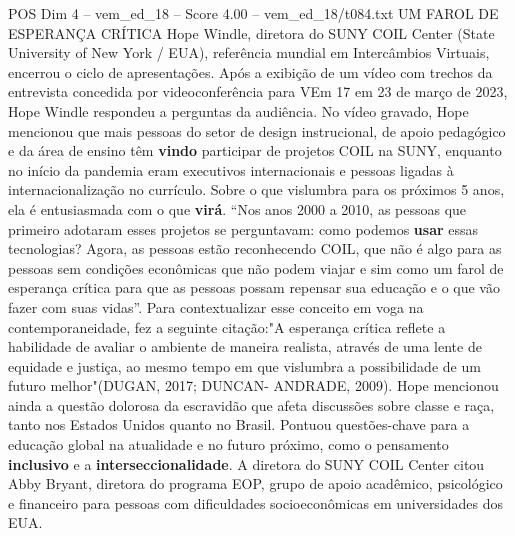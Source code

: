\begin{textsample}{POS Dim 4 – vem\_ed\_18 – Score 4.00 – vem\_ed\_18/t084.txt}  \label{ex:f4_pos_047}
UM FAROL DE ESPERANÇA CRÍTICA Hope Windle, diretora do SUNY COIL Center (State University of New York / EUA), referência mundial em Intercâmbios Virtuais, encerrou o ciclo de apresentações.
Após a exibição de um vídeo com trechos da entrevista concedida por videoconferência para VEm 17 em 23 de março de 2023, Hope Windle respondeu a perguntas da audiência.
No vídeo gravado, Hope mencionou que mais pessoas do setor de design instrucional, de apoio pedagógico e da área de ensino têm \textbf{vindo} participar de projetos COIL na SUNY, enquanto no início da pandemia eram executivos internacionais e pessoas ligadas à internacionalização no currículo.
Sobre o que vislumbra para os próximos 5 anos, ela é entusiasmada com o que \textbf{virá}. “Nos anos 2000 a 2010, as pessoas que primeiro adotaram esses projetos se perguntavam: como podemos \textbf{usar} essas tecnologias?
Agora, as pessoas estão reconhecendo COIL, que não é algo para as pessoas sem condições econômicas que não podem viajar e sim como um farol de esperança crítica para que as pessoas possam repensar sua educação e o que vão fazer com suas vidas”.
Para contextualizar esse conceito em voga na contemporaneidade, fez a seguinte citação:"A esperança crítica reflete a habilidade de avaliar o ambiente de maneira realista, através de uma lente de equidade e justiça, ao mesmo tempo em que vislumbra a possibilidade de um futuro melhor"(DUGAN, 2017; DUNCAN- ANDRADE, 2009).
Hope mencionou ainda a questão dolorosa da escravidão que afeta discussões sobre classe e raça, tanto nos Estados Unidos quanto no Brasil.
Pontuou questões-chave para a educação global na atualidade e no futuro próximo, como o pensamento \textbf{inclusivo} e a \textbf{interseccionalidade}.
A diretora do SUNY COIL Center citou Abby Bryant, diretora do programa EOP, grupo de apoio acadêmico, psicológico e financeiro para pessoas com dificuldades socioeconômicas em universidades dos EUA.

\end{textsample}
